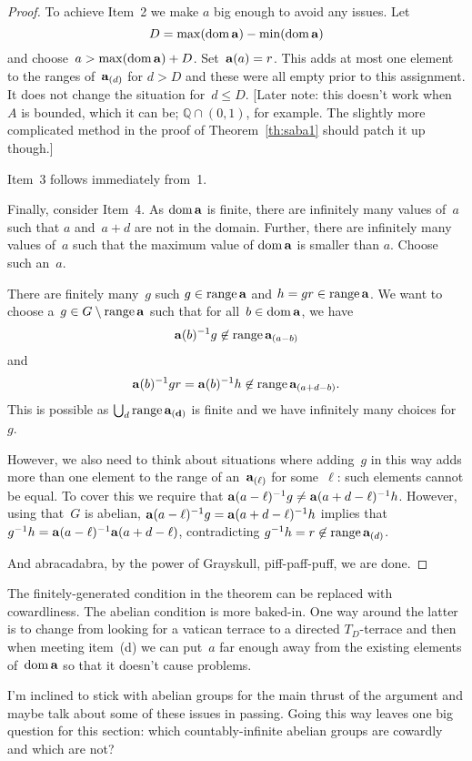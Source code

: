 \documentclass[a4paper,12pt]{article}
\newcommand{\Q}{\mathbb{Q}}
\newcommand{\dom}{\mathop{\rm dom}\nolimits}
\newcommand{\range}{\mathop{\rm range}\nolimits}
\begin{document}
\begin{proof}
To achieve Item~2 we make $a$ big enough to avoid any issues.  Let $$D = \max(\dom{{\bf a}}) - \min(\dom{{\bf a}})$$ and choose~$a > \max(\dom{{\bf a}}) + D$.  Set~${\bf a}(a) = r$.  This adds at most one element to the ranges of~${\bf a}_{(d)}$ for $d > D$ and these were all empty prior to this assignment.  It does not change the situation for~$d \leq D$.   [Later note: this doesn't work when~$A$ is bounded, which it can be; $\Q \cap (0,1)$, for example.  The slightly more complicated method in the proof of Theorem~\ref{th:saba1} should patch it up though.]

Item~3 follows immediately from~1.

Finally, consider Item~4.  As $\dom{{\bf a}}$ is finite, there are infinitely many values of~$a$ such that $a$ and~$a+d$ are not in the domain.   Further, there are infinitely many values of~$a$ such that the maximum value of $\dom{{\bf a}}$  is smaller than $a$.  Choose such an~$a$.  

There are finitely many~$g$ such $g \in \range{{\bf a}}$ and $h = gr \in  \range{{\bf a}}$.  We want to choose a~$g \in G \setminus \range{{\bf a}}$ such that for all~$b \in \dom{{\bf a}}$, we have $${\bf a}(b)^{-1}g \not\in \range{{\bf a}_{(a-b)}}$$ and $$  {\bf a}(b)^{-1}gr =  {\bf a}(b)^{-1}h \not\in \range{{\bf a}_{(a+d-b)}}.$$
This is possible as $\bigcup_{d} \range{{\bf a_{(d)}}}$ is finite and we have infinitely many choices for~$g$.

However, we also need to think about situations where adding~$g$ in this way adds more than one element to the range of an~${\bf a}_{(\ell)}$ for some~$\ell$: such elements cannot be equal. To cover this we require that ${\bf a}(a-\ell)^{-1}g \neq {\bf a}(a+d-\ell)^{-1}h$.  However, using that~$G$ is abelian, ${\bf a}(a-\ell)^{-1}g = {\bf a}(a+d-\ell)^{-1}h$ implies that $g^{-1}h = {\bf a}(a-\ell)^{-1}{\bf a}(a+d-\ell)$, contradicting $g^{-1}h = r \not\in \range{{\bf a}_{(d)}}$.


And abracadabra, by the power of Grayskull, piff-paff-puff, we are done.
\end{proof}

The finitely-generated condition in the theorem can be replaced with cowardliness.  The abelian condition is more baked-in.  One way around the latter is to change from looking for a vatican terrace to a directed $T_D$-terrace and then when meeting item~(d) we can put~$a$ far enough away from the existing elements of~$\dom {\bf a}$ so that it doesn't cause problems.

I'm inclined to stick with abelian groups for the main thrust of the argument and maybe talk about some of these issues in passing.  Going this way leaves one big question for this section: which countably-infinite abelian groups are cowardly and which are not?
\end{document}
